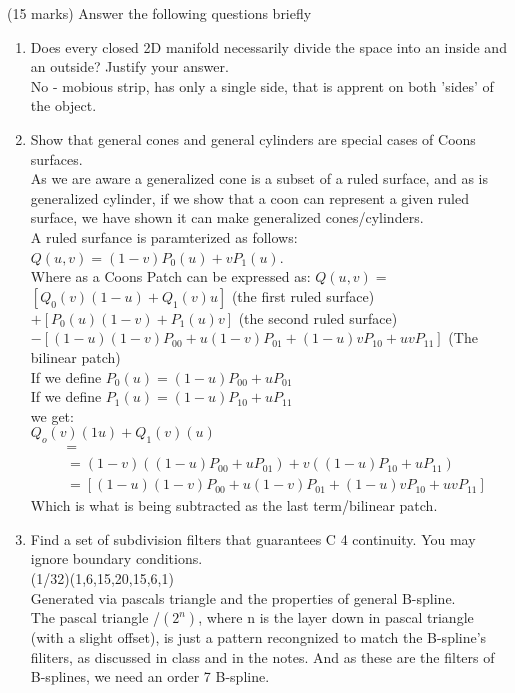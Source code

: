 (15 marks) Answer the following questions briefly
\begin{enumerate}
\item Does every closed 2D manifold necessarily divide the space into an inside and an outside? Justify your answer. \\
No - mobious strip, has only a single side, that is apprent on both 'sides' of the object.\\

\item Show that general cones and general cylinders are special cases of Coons surfaces. \\
As we are aware a generalized cone is a subset of a ruled surface, and as is generalized cylinder, if we show that a coon can represent a given ruled surface, we have shown it can make generalized cones/cylinders. \\

A ruled surfance is paramterized as follows: $Q(u,v) = (1 - v)P_0(u) + vP_1(u)$. \\
Where as a Coons Patch can be expressed as: $Q(u, v) =$ \\
$[Q_0 (v)(1 - u) + Q_1 (v)u]$ (the first ruled surface) \\
$+ [P_0 (u)(1 - v) + P_1 (u)v]$ (the second ruled surface) \\
$- [(1 - u)(1 - v)P_{00} + u(1 - v)P_{01} + (1 - u)vP_{10} + uvP_{11} ]$ (The bilinear patch) \\

If we define $P_0(u) = (1-u)P_{00} + uP_{01}$ \\
If we define $P_1(u) = (1-u)P_{10} + uP_{11}$ \\
we get: \\
$Q_o(v)(1u) + Q_1(v)(u)$ \\
\begin{align*}
[P_0 (u)(1 - v) + P_1 (u)v] &= \\
&= (1-v)((1-u)P_{00} + uP_{01}) + v((1-u)P_{10} + uP_{11}) \\
&= [(1 - u)(1 - v)P_{00} + u(1 - v)P_{01} + (1 - u)vP_{10} + uvP_{11} ]
\end{align*}
Which is what is being subtracted as the last term/bilinear patch.

\item Find a set of subdivision filters that guarantees C 4 continuity. You may ignore boundary
conditions. \\
(1/32)(1,6,15,20,15,6,1) \\
Generated via pascals triangle and the properties of general B-spline. \\
The pascal triangle /$(2^n)$, where n is the layer down in pascal triangle (with a slight offset), is just a pattern recongnized to match the B-spline's filiters, as discussed in class and in the notes. And as these are the filters of B-splines, we need an order 7 B-spline.
\end{enumerate}
